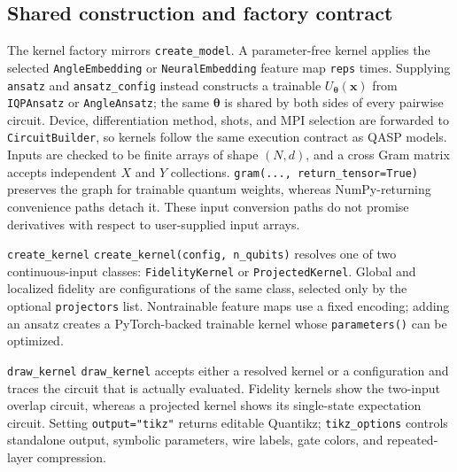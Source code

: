 \documentclass[10pt]{article}
\newcommand{\code}[1]{\texttt{#1}}
\begin{document}
\subsection{Shared construction and factory contract}
\label{sec:kernel-factory}

The kernel factory mirrors \code{create\_model}.  A parameter-free kernel
applies the selected \code{AngleEmbedding} or \code{NeuralEmbedding} feature
map \code{reps} times.  Supplying \code{ansatz} and
\code{ansatz\_config} instead constructs a trainable
$U_{\bm\theta}(\bm{x})$ from \code{IQPAnsatz} or \code{AngleAnsatz}; the same
$\bm\theta$ is shared by both sides of every pairwise circuit.  Device,
differentiation method, shots, and MPI selection are forwarded to
\code{CircuitBuilder}, so kernels follow the same execution contract as QASP
models.  Inputs are checked to be finite arrays of shape
$(N,d)$, and a cross Gram matrix accepts independent $X$ and $Y$ collections.
\code{gram(..., return\_tensor=True)} preserves the graph for trainable quantum
weights, whereas NumPy-returning convenience paths detach it.  These input
conversion paths do not promise derivatives with respect to user-supplied
input arrays.

\begin{qaspfeature}{\code{create\_kernel}}
\code{create\_kernel(config, n\_qubits)} resolves one of two continuous-input
classes: \code{FidelityKernel} or \code{ProjectedKernel}.  Global and
localized fidelity are configurations of the same class, selected only by the
optional \code{projectors} list.  Nontrainable feature maps use a fixed
encoding; adding an ansatz creates a PyTorch-backed trainable kernel whose
\code{parameters()} can be optimized.
\end{qaspfeature}

\begin{qaspfeature}{\code{draw\_kernel}}
\code{draw\_kernel} accepts either a resolved kernel or a configuration and
traces the circuit that is actually evaluated.  Fidelity kernels show the
two-input overlap circuit, whereas a projected kernel shows its single-state
expectation circuit.  Setting \code{output="tikz"} returns editable Quantikz;
\code{tikz\_options} controls standalone output, symbolic parameters, wire
labels, gate colors, and repeated-layer compression.
\end{qaspfeature}
\end{document}
